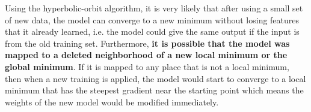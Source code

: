 \documentclass{article}
\theoremstyle{plain}
\theoremstyle{plain} %
\theoremstyle{definition}  %
\theoremstyle{remark}  %
\theoremstyle{plain}
\begin{document}
Using the hyperbolic-orbit algorithm, it is very likely that after using a small set of new data, the model can converge to a new minimum without losing features that it already learned, i.e. the model could give the same output if the input is from the old training set. Furthermore, \textbf{it is possible that the model was mapped to a deleted neighborhood of a new local minimum or the global minimum}. If it is mapped to any place that is not a local minimum, then when a new training is applied, the model would start to converge to a local minimum that has the steepest gradient near the starting point which means the weights of the new model would be modified immediately.



\end{document}
